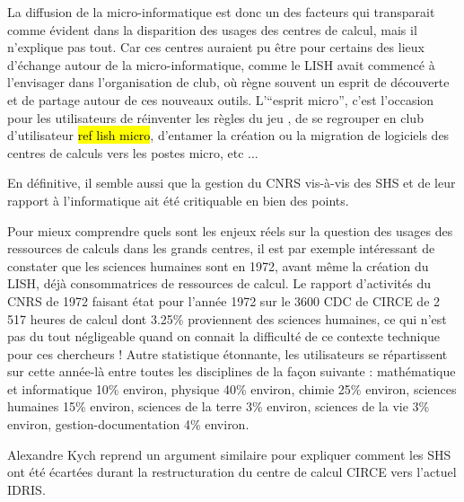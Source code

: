 La diffusion de la micro-informatique est donc un des facteurs qui transparait comme évident dans la disparition des usages des centres de calcul, mais il n'explique pas tout. Car ces centres auraient pu être pour certains des lieux d'échange autour de la micro-informatique, comme le LISH avait commencé à l'envisager dans l'organisation de club, où règne souvent un esprit de découverte et de partage autour de ces nouveaux outils. L'\enquote{esprit micro}, c'est l'occasion pour les utilisateurs de réinventer les règles du jeu , de se regrouper en club d'utilisateur \hl{ref lish micro}, d'entamer la création ou la migration de logiciels des centres de calculs vers les postes micro, etc ...

En définitive, il semble aussi que la gestion du CNRS vis-à-vis des SHS et de leur rapport à l'informatique ait été critiquable en bien des points.

Pour mieux comprendre quels sont les enjeux réels sur la question des usages des ressources de calculs dans les grands centres, il est par exemple intéressant de constater que les sciences humaines sont en 1972, avant même la création du LISH, déjà consommatrices de ressources de calcul. Le rapport d’activités du CNRS de 1972 faisant état pour l’année 1972 sur le 3600 CDC de CIRCE de 2 517 heures de calcul dont 3.25\% proviennent des sciences humaines, ce qui n’est pas du tout négligeable quand on connait la difficulté de ce contexte technique pour ces chercheurs ! Autre statistique étonnante, les utilisateurs se répartissent sur cette année-là entre toutes les disciplines  de la façon suivante : mathématique et informatique 10\% environ, physique 40\% environ, chimie 25\% environ, sciences humaines 15\% environ, sciences de la terre 3\% environ, sciences de la vie 3\% environ, gestion-documentation 4\% environ.

Alexandre Kych reprend un argument similaire pour expliquer comment les SHS ont été écartées durant la restructuration du centre de calcul CIRCE vers l'actuel IDRIS.

